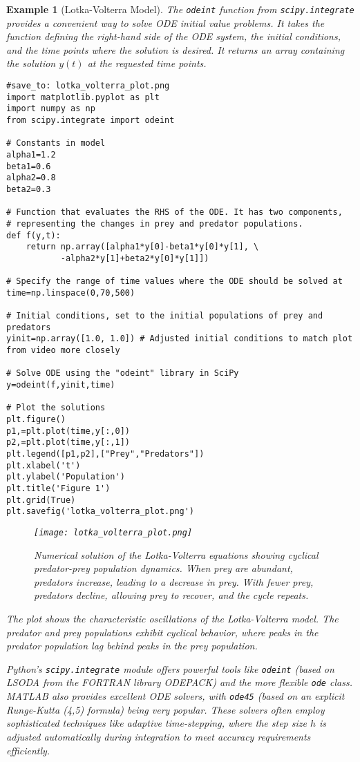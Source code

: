 \documentclass{article}
\newtheorem{example}{Example}
\begin{document}
\begin{example}[Lotka-Volterra Model]
The \texttt{odeint} function from \texttt{scipy.integrate} provides a convenient way to solve ODE initial value problems. It takes the function defining the right-hand side of the ODE system, the initial conditions, and the time points where the solution is desired. It returns an array containing the solution $y(t)$ at the requested time points.

\begin{verbatim}
#save_to: lotka_volterra_plot.png
import matplotlib.pyplot as plt
import numpy as np
from scipy.integrate import odeint

# Constants in model
alpha1=1.2
beta1=0.6
alpha2=0.8
beta2=0.3

# Function that evaluates the RHS of the ODE. It has two components,
# representing the changes in prey and predator populations.
def f(y,t):
    return np.array([alpha1*y[0]-beta1*y[0]*y[1], \
           -alpha2*y[1]+beta2*y[0]*y[1]])

# Specify the range of time values where the ODE should be solved at
time=np.linspace(0,70,500)

# Initial conditions, set to the initial populations of prey and predators
yinit=np.array([1.0, 1.0]) # Adjusted initial conditions to match plot from video more closely

# Solve ODE using the "odeint" library in SciPy
y=odeint(f,yinit,time)

# Plot the solutions
plt.figure()
p1,=plt.plot(time,y[:,0])
p2,=plt.plot(time,y[:,1])
plt.legend([p1,p2],["Prey","Predators"])
plt.xlabel('t')
plt.ylabel('Population')
plt.title('Figure 1')
plt.grid(True)
plt.savefig('lotka_volterra_plot.png')
\end{verbatim}

\begin{figure}[h]
    \centering
    \texttt{[image: lotka\_volterra\_plot.png]}
    \caption{Numerical solution of the Lotka-Volterra equations showing cyclical predator-prey population dynamics. When prey are abundant, predators increase, leading to a decrease in prey. With fewer prey, predators decline, allowing prey to recover, and the cycle repeats.}
    \label{fig:lotka_volterra}
\end{figure}

The plot shows the characteristic oscillations of the Lotka-Volterra model. The predator and prey populations exhibit cyclical behavior, where peaks in the predator population lag behind peaks in the prey population.

Python's \texttt{scipy.integrate} module offers powerful tools like \texttt{odeint} (based on LSODA from the FORTRAN library ODEPACK) and the more flexible \texttt{ode} class. MATLAB also provides excellent ODE solvers, with \texttt{ode45} (based on an explicit Runge-Kutta (4,5) formula) being very popular. These solvers often employ sophisticated techniques like adaptive time-stepping, where the step size $h$ is adjusted automatically during integration to meet accuracy requirements efficiently.
\end{example}
\end{document}
